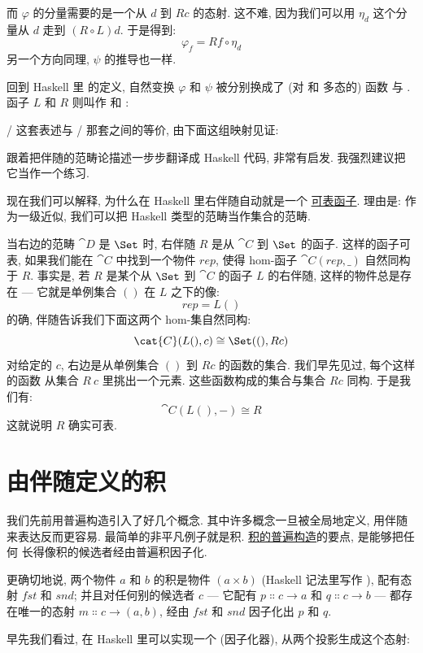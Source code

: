 而 $\varphi$ 的分量需要的是一个从 $d$ 到 $R c$ 的态射. 这不难, 因为我们可以用 $\eta_d$
这个分量从 $d$ 走到 $(R \circ L) d$. 于是得到:
\[\varphi_f = R f \circ \eta_d\]
另一个方向同理, $\psi$ 的推导也一样.

回到 Haskell 里  的定义, 自然变换 $\varphi$ 和 $\psi$ 被分别换成了
(对  和  多态的) 函数  与 .
函子 $L$ 和 $R$ 则叫作  和 :

/ 这套表述与 /\allowbreak{}
那套之间的等价, 由下面这组映射见证:

跟着把伴随的范畴论描述一步步翻译成 Haskell 代码, 非常有启发. 我强烈建议把它当作一个练习.

现在我们可以解释, 为什么在 Haskell 里右伴随自动就是一个
\hyperref[representable-functors]{可表函子}. 理由是: 作为一级近似, 我们可以把 Haskell
类型的范畴当作集合的范畴.

当右边的范畴 $\cat{D}$ 是 $\Set$ 时, 右伴随 $R$ 是从 $\cat{C}$ 到 $\Set$ 的函子.
这样的函子可表, 如果我们能在 $\cat{C}$ 中找到一个物件 $rep$, 使得 hom-函子
$\cat{C}(rep, \_)$ 自然同构于 $R$. 事实是, 若 $R$ 是某个从 $\Set$ 到 $\cat{C}$ 的函子
$L$ 的右伴随, 这样的物件总是存在 --- 它就是单例集合 $()$ 在 $L$ 之下的像:
\[rep = L ()\]
的确, 伴随告诉我们下面这两个 hom-集自然同构:
\[\cat{C}(L (), c) \cong \Set((), R c)\]
对给定的 $c$, 右边是从单例集合 $()$ 到 $R c$ 的函数的集合. 我们早先见过, 每个这样的函数
从集合 $R\ c$ 里挑出一个元素. 这些函数构成的集合与集合 $R c$ 同构. 于是我们有:
\[\cat{C}(L (), -) \cong R\]
这就说明 $R$ 确实可表.

\section{由伴随定义的积}

我们先前用普遍构造引入了好几个概念. 其中许多概念一旦被全局地定义, 用伴随来表达反而更容易.
最简单的非平凡例子就是积. \hyperref[products-and-coproducts]{积的普遍构造}的要点, 是能够把任何
长得像积的候选者经由普遍积因子化.

更确切地说, 两个物件 $a$ 和 $b$ 的积是物件 $(a\times{}b)$ (Haskell 记法里写作 ),
配有态射 $fst$ 和 $snd$; 并且对任何别的候选者 $c$ --- 它配有 $p \Colon c \to a$ 和
$q \Colon c \to b$ --- 都存在唯一的态射 $m \Colon c \to (a, b)$, 经由 $fst$ 和 $snd$
因子化出 $p$ 和 $q$.

早先我们看过, 在 Haskell 里可以实现一个  (因子化器), 从两个投影生成这个态射:

